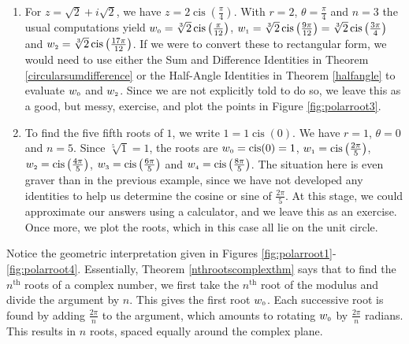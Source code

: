 {\begin{enumerate}
\item  For $z = \sqrt{2} + i \sqrt{2}$, we have $z = 2\operatorname{cis}\left(\frac{\pi}{4}\right)$.  With $r = 2$, $\theta = \frac{\pi}{4}$ and $n =3$ the usual computations yield $w_{\text{\tiny$0$}} = \sqrt[3]{2} \operatorname{cis}\left(\frac{\pi}{12}\right)$,  $w_{\text{\tiny$1$}} = \sqrt[3]{2} \operatorname{cis}\left(\frac{9\pi}{12}\right) = \sqrt[3]{2} \operatorname{cis}\left(\frac{3\pi}{4}\right) $ and  $w_{\text{\tiny$2$}} = \sqrt[3]{2} \operatorname{cis}\left(\frac{17\pi}{12}\right)$.  If we were to  convert these to rectangular form, we would need to use either the Sum and Difference Identities in Theorem \ref{circularsumdifference} or the Half-Angle Identities in Theorem \ref{halfangle} to evaluate $w_{\text{\tiny$0$}}$ and  $w_{\text{\tiny$2$}}$.  Since we are not explicitly told to do so, we leave this as a good, but messy, exercise, and plot the points in Figure \ref{fig:polarroot3}.


\item  To find the five fifth roots of $1$, we write $1 = 1 \operatorname{cis}(0)$.  We have $r = 1$, $\theta = 0$ and $n = 5$. Since $\sqrt[5]{1} = 1$, the roots are  $w_{\text{\tiny$0$}} = \operatorname{cis}(0) = 1$, $w_{\text{\tiny$1$}} = \operatorname{cis}\left(\frac{2\pi}{5}\right)$, $w_{\text{\tiny$2$}} = \operatorname{cis}\left(\frac{4\pi}{5}\right)$, $w_{\text{\tiny$3$}} = \operatorname{cis}\left(\frac{6\pi}{5}\right)$ and $w_{\text{\tiny$4$}} = \operatorname{cis}\left(\frac{8\pi}{5}\right)$.  The situation here is even graver than in the previous example, since we have not developed any identities to help us determine the cosine or sine of $\frac{2\pi}{5}$.  At this stage, we could approximate our answers using a calculator, and we leave this as an exercise. Once more, we plot the roots, which in this case all lie on the unit circle.


\end{enumerate}
}

\medskip

Notice the geometric interpretation given in Figures \ref{fig:polarroot1}-\ref{fig:polarroot4}.  Essentially,  Theorem \ref{nthrootscomplexthm} says that to find the $n^{\text{th}}$ roots of a complex number,  we first take the $n^{\text{th}}$ root of the modulus and divide the argument by $n$.  This gives the first root  $w_{\text{\tiny$0$}}$. Each successive root is found by adding  $\frac{2\pi}{n}$ to the argument, which amounts to rotating $w_{\text{\tiny$0$}}$ by $\frac{2\pi}{n}$ radians.  This results in $n$ roots, spaced equally around the complex plane.  

